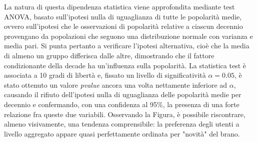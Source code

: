 \documentclass[fleqn,10pt]{SelfArx} %
\begin{document}
La natura di questa dipendenza statistica viene approfondita mediante test ANOVA, basato sull'ipotesi nulla di uguaglianza di tutte le popolarità medie, ovvero sull'ipotesi che le osservazioni di popolarità relative a ciascun decennio provengano da popolazioni che seguono una distribuzione normale con varianza e media pari. Si punta pertanto a verificare l'ipotesi alternativa, cioè che la media di almeno un gruppo differisca dalle altre, dimostrando che il fattore condizionante della decade ha un'influenza sulla popolarità. La statistica test è associata a 10 gradi di libertà e, fissato un livello di significatività $\alpha=0.05$, è stato ottenuto un valore \textit{pvalue} ancora una volta nettamente inferiore ad $\alpha$, causando il rifiuto dell'ipotesi nulla di uguaglianza delle popolarità medie per decennio e confermando, con una confidenza al 95\%, la presenza di una forte relazione fra queste due variabili. Osservando la Figura, è possibile riscontrare, almeno visivamente, una tendenza comprensibile: la preferenza degli utenti a livello aggregato appare quasi perfettamente ordinata per "novità" del brano.
\end{document}
